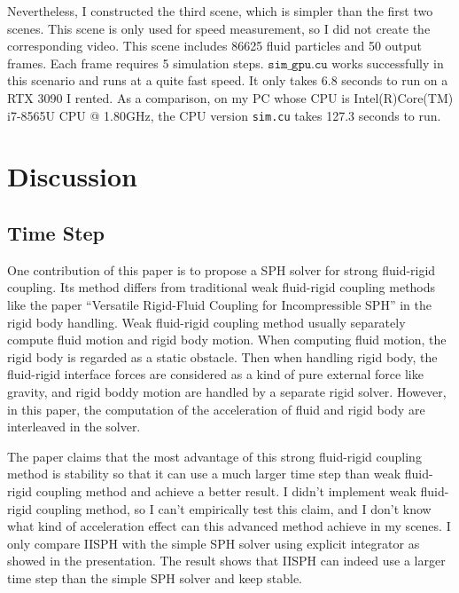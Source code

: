 \documentclass[acmlarge]{acmart}
\begin{document}
Nevertheless, I constructed the third scene, which is simpler than the first two scenes. 
This scene is only used for speed measurement, so I did not create the corresponding video.
This scene includes 86625 fluid particles and 50 output frames. Each frame requires 5 simulation steps. 
$\texttt{sim\_gpu.cu}$ works successfully in this scenario and runs at a quite fast speed. 
It only takes 6.8 seconds to run on a RTX 3090 I rented. As a comparison, on my PC whose CPU is
Intel(R)Core(TM) i7-8565U CPU @ 1.80GHz, the CPU version \texttt{sim.cu} takes 127.3 seconds to run.

\section{Discussion}

\subsection{Time Step}

One contribution of this paper\cite{2019TOG} is to propose a SPH solver for strong fluid-rigid coupling.
Its method differs from traditional weak fluid-rigid coupling methods like
the paper ``Versatile Rigid-Fluid Coupling for Incompressible SPH''\cite{AK2012}
in the rigid body handling.
Weak fluid-rigid coupling method usually separately compute fluid motion and rigid body motion.
When computing fluid motion, the rigid body is regarded as a static obstacle. Then when handling rigid body,
the fluid-rigid interface forces are considered as a kind of pure external force like gravity, and rigid boddy motion
are handled by a separate rigid solver. However, in this paper, the 
computation of the acceleration of fluid and rigid body are interleaved in the
solver.

The paper claims that the most advantage of this strong fluid-rigid coupling method is stability so that 
it can use a much larger time step than weak fluid-rigid coupling method and achieve a better result.
I didn't implement weak fluid-rigid coupling method, so I can't empirically test this claim, and I don't 
know what kind of acceleration effect can this advanced method achieve in my scenes.
I only compare IISPH with the simple SPH solver using explicit integrator as showed in the presentation. 
The result shows that IISPH can indeed use a larger time step than the simple SPH solver and keep stable.
\end{document}
